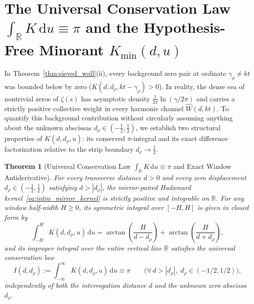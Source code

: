 \documentclass[11pt,reqno]{amsart}
\newtheorem{theorem}{Theorem}[section]
\theoremstyle{definition}
\theoremstyle{remark}
\numberwithin{equation}{section}
\newcommand{\R}{\mathbb{R}}
\newcommand{\dd}{\mathrm{d}}
\begin{document}
\section{The Universal Conservation Law $\int_{\R} K\,\dd u \equiv \pi$ and the Hypothesis-Free Minorant $K_{\min}(d,u)$}\label{sec:conservation}

In Theorem~\ref{thm:sieved_wall}(ii), every background zero pair at ordinate $\gamma_\rho \neq kt$ was bounded below by zero ($K(d, d_\rho, kt - \gamma_\rho) > 0$). In reality, the dense sea of nontrivial zeros of $\zeta(s)$ has asymptotic density $\frac{1}{2\pi}\ln(\gamma/2\pi)$ and carries a strictly positive collective weight in every harmonic channel $\widehat{W}(d,kt)$. To quantify this background contribution without circularly assuming anything about the unknown abscissas $d_\rho \in (-\frac{1}{2}, \frac{1}{2})$, we establish two structural properties of $K(d, d_\rho, u)$: its conserved $\pi$-integral and its exact difference factorization relative to the strip boundary $d_\rho \to \frac{1}{2}$.

\begin{theorem}[Universal Conservation Law $\int_{\R} K\,\dd u \equiv \pi$ and Exact Window Antiderivative]\label{thm:conservation}
For every transverse distance $d > 0$ and every zero displacement $d_\rho \in (-\frac{1}{2}, \frac{1}{2})$ satisfying $d > |d_\rho|$, the mirror-paired Hadamard kernel~\eqref{eq:intro_mirror_kernel} is strictly positive and integrable on $\R$. For any window half-width $H \ge 0$, its symmetric integral over $[-H, H]$ is given in closed form by
\begin{equation}\label{eq:Phi_plat_rho}
\int_{-H}^H K(d, d_\rho, u)\,\dd u = \arctan\!\left(\frac{H}{d - d_\rho}\right) + \arctan\!\left(\frac{H}{d + d_\rho}\right),
\end{equation}
and its improper integral over the entire vertical line $\R$ satisfies the universal conservation law
\begin{equation}\label{eq:pi_conservation}
I(d, d_\rho) := \int_{-\infty}^{\infty} K(d, d_\rho, u)\,\dd u \equiv \pi \qquad \bigl(\forall\,d > |d_\rho|,\; d_\rho \in (-1/2, 1/2)\bigr),
\end{equation}
independently of both the interrogation distance $d$ and the unknown zero abscissa $d_\rho$.
\end{theorem}
\end{document}
